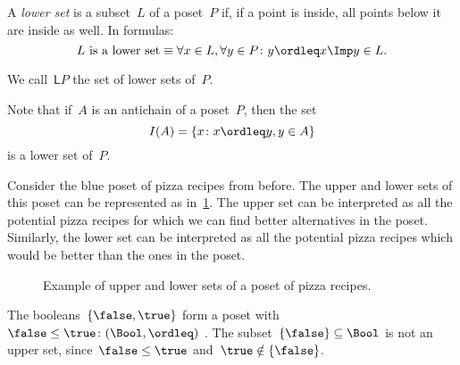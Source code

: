 \begin{definition}
    \label{def:lowerset}
    A \emph{lower set} is a subset~$L$ of a poset~$P$ if, if a point is inside, all points below it are inside as well. In formulas:
    \begin{equation}
        \text{$L$ is a lower set} \equiv \forall x\in L, \forall y\in P\colon y\ordleq x \Imp y\in L.
    \end{equation}
\end{definition}
\begin{remark}
    We call~$\mathsf{L}P$ the set of lower sets of~$P$.
\end{remark}

\begin{remark}
    Note that if~$A$ is an antichain of a poset~$P$, then the set
    \begin{equation}
        I(A)=\{x\colon x\ordleq y, y\in A\}
    \end{equation}
    is a lower set of~$P$.
\end{remark}

Consider the blue poset of pizza recipes from before. The upper and lower sets of this poset can be represented as in~\cref{fig:upperset}. The upper set can be interpreted as all the potential pizza recipes for which we can find better alternatives in the poset. Similarly, the lower set can be interpreted as all the potential pizza recipes which would be better than the ones in the poset.

\begin{figure}[h!]
    \begin{center}
    \end{center}
    \caption{Example of upper and lower sets of a poset of pizza recipes. \label{fig:upperset}}
\end{figure}
\begin{example}
    The booleans~$\{\false, \true \}$ form a poset with~$\false \leq \true\colon(\Bool,\ordleq)$ . The subset~$\{\false\} \subseteq \Bool$ is not an upper set, since~$\false \leq \true$ and~$\true \notin \{\false \}$.
\end{example}



